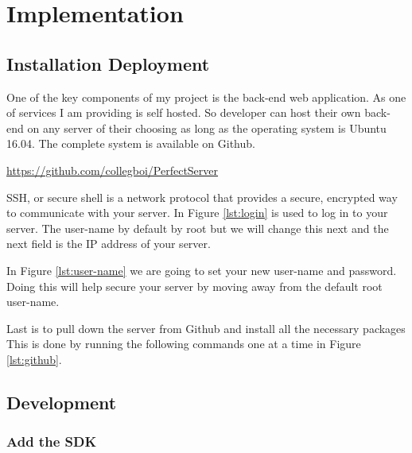 \chapter{Implementation}


\section{Installation Deployment}

One of the key components of my project is the back-end web application. As one of services I am providing is self hosted. So developer can host their own back-end on any server of their choosing as long as the operating system is Ubuntu 16.04. The complete system is available on Github.

\url{https://github.com/collegboi/PerfectServer}



SSH, or secure shell is a network protocol that provides a secure, encrypted way to communicate with your server. In Figure \ref{lst:login} is used to log in to your server. The user-name by default by root but we will change this next and the next field is the IP address of your server.




 In Figure \ref{lst:user-name} we are going to set your new user-name and password. Doing this will help secure your server by moving away from the default root user-name.


Last is to pull down the server from Github and install all the necessary packages This is done by running the following commands one at a time in Figure \ref{lst:github}.


\section{Development}

\subsection{Add the SDK}



